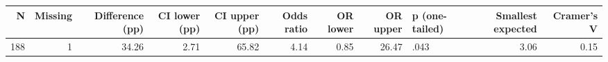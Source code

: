 \begingroup\footnotesize
\begin{tabular}{rrrrrrrrlrr}
  \toprule
N & Missing & Difference (pp) & CI lower (pp) & CI upper (pp) & Odds ratio & OR lower & OR upper & p (one-tailed) & Smallest expected & Cramer's V \\ 
  \midrule
188 &   1 & 34.26 & 2.71 & 65.82 & 4.14 & 0.85 & 26.47 & .043 & 3.06 & 0.15 \\ 
   \bottomrule
\end{tabular}
\endgroup
